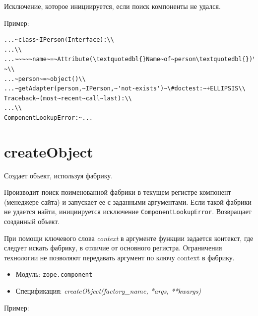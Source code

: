\documentclass[a4paper,openany,twoside,draft]{book}
\providecommand*{\DUroletitlereference}[1]{\textsl{#1}}
\begin{document}
Исключение, которое инициируется, если поиск компоненты не удался.

Пример:

\begin{verbatim}
...~class~IPerson(Interface):\\
...\\
...~~~~~name~=~Attribute(\textquotedbl{}Name~of~person\textquotedbl{})\\
~\\
...~person~=~object()\\
...~getAdapter(person,~IPerson,~'not-exists')~\#doctest:~+ELLIPSIS\\
Traceback~(most~recent~call~last):\\
...\\
ComponentLookupError:~...
\end{verbatim}


\section*{createObject%
  \label{createobject}%
}

Создает объект, используя фабрику.

Производит поиск поименованной фабрики в текущем регистре
компонент (менеджере сайта) и запускает ее с заданными аргументами.
Если такой фабрики не удается найти, инициируется исключение
\texttt{ComponentLookupError}.  Возвращает созданный объект.

При помощи ключевого слова \DUroletitlereference{context} в аргументе функции задается
контекст, где следует искать фабрику, в отличие от основного регистра.
Ограничения технологии не позволяют передавать аргумент по ключу
\textquotedbl{}context\textquotedbl{} в фабрику.

\begin{itemize}

\item Модуль: \texttt{zope.component}

\item Спецификация: \DUroletitlereference{createObject(factory\_name, *args, **kwargs)}

\end{itemize}

Пример:
\end{document}
